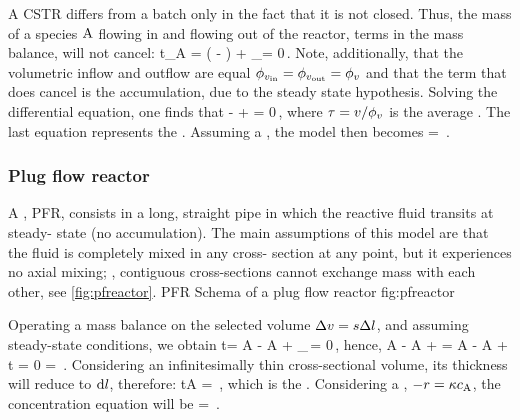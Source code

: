 A CSTR differs from a batch only in the fact that it is not closed. Thus, the mass of a species $\ce A$ flowing in and flowing out of the reactor, terms in the mass balance, will not cancel:
\beq
\iod t\mass_{\ce A} = \flow\vol\left( - \right) + \int_\vol\rrate\dx\vol = 0\,.
\eeq
Note, additionally, that the volumetric inflow and outflow are equal $\phi_{v_\text{in}} = \phi_{v_\text{out}} = \phi_{v}$ and that the term that does cancel is the accumulation, due to the steady state hypothesis. Solving the differential equation, one finds that
\beq
{} -  + \rtime\rrate = 0\,,
\eeq
where $\tau = v/\phi_{v}$ is the average . The last equation represents the . Assuming a , the model then becomes
\beq
{} = \,.
\eeq


\subsubsection{Plug flow reactor}
A , PFR, consists in a long, straight pipe in which the reactive fluid transits at steady- state (no accumulation). The main assumptions of this model are that the fluid is completely mixed in any cross- section at any point, but it experiences no axial mixing; \ie, contiguous cross-sections cannot exchange mass with each other, see \cref{fig:pfreactor}.
%
   {PFR}
   {Schema of a plug flow reactor}%
   {fig:pfreactor}%

Operating a mass balance on the selected volume $\Delta v = s\Delta l$, and assuming steady-state conditions, we obtain
\beq
\iod t\mass = \flow\vol\conc A - \flow\vol\conc A + \int_{\Dx\vol}\rrate\,\dx\vol = 0\,,
\eeq
hence,
\beq
\flow\vol\conc A - \flow\vol\conc A + \rrate\Dx\vol = 
\flow\vol\conc A - \flow\vol\conc A + \rrate\flow\vol\Dx t = 0
\implies
{} = \rrate\,.
\eeq
Considering an infinitesimally thin cross-sectional volume, its thickness will reduce to $\text{d}l$, therefore:
\beq
\iod t\conc A = \rrate\,,
\eeq
which is the . Considering a , $-\rrate = \krcoeff\conc A$, the concentration equation will be
\beq
{} = \exp{}\,.
\eeq


